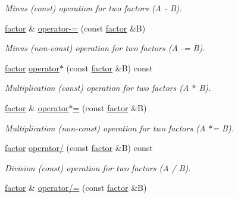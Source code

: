 \begin{DoxyCompactItemize}
\begin{DoxyCompactList}\small\item\em Minus (const) operation for two factors (A -\/ B). \end{DoxyCompactList}\item 
\hyperlink{classmerlin_1_1factor}{factor} \& \hyperlink{classmerlin_1_1factor_a10de91f232933d6631760cf49e2a166b}{operator-\/=} (const \hyperlink{classmerlin_1_1factor}{factor} \&B)\hypertarget{classmerlin_1_1factor_a10de91f232933d6631760cf49e2a166b}{}\label{classmerlin_1_1factor_a10de91f232933d6631760cf49e2a166b}

\begin{DoxyCompactList}\small\item\em Minus (non-\/const) operation for two factors (A -\/= B). \end{DoxyCompactList}\item 
\hyperlink{classmerlin_1_1factor}{factor} \hyperlink{classmerlin_1_1factor_aeea27e3b1a15d46577da00027302e635}{operator$\ast$} (const \hyperlink{classmerlin_1_1factor}{factor} \&B) const \hypertarget{classmerlin_1_1factor_aeea27e3b1a15d46577da00027302e635}{}\label{classmerlin_1_1factor_aeea27e3b1a15d46577da00027302e635}

\begin{DoxyCompactList}\small\item\em Multiplication (const) operation for two factors (A $\ast$ B). \end{DoxyCompactList}\item 
\hyperlink{classmerlin_1_1factor}{factor} \& \hyperlink{classmerlin_1_1factor_af2a5efa9f529f8909d7114741a0d2a9e}{operator$\ast$=} (const \hyperlink{classmerlin_1_1factor}{factor} \&B)\hypertarget{classmerlin_1_1factor_af2a5efa9f529f8909d7114741a0d2a9e}{}\label{classmerlin_1_1factor_af2a5efa9f529f8909d7114741a0d2a9e}

\begin{DoxyCompactList}\small\item\em Multiplication (non-\/const) operation for two factors (A $\ast$= B). \end{DoxyCompactList}\item 
\hyperlink{classmerlin_1_1factor}{factor} \hyperlink{classmerlin_1_1factor_a2e9e4fc69ae5f7dd8a61e54f8aaabb52}{operator/} (const \hyperlink{classmerlin_1_1factor}{factor} \&B) const \hypertarget{classmerlin_1_1factor_a2e9e4fc69ae5f7dd8a61e54f8aaabb52}{}\label{classmerlin_1_1factor_a2e9e4fc69ae5f7dd8a61e54f8aaabb52}

\begin{DoxyCompactList}\small\item\em Division (const) operation for two factors (A / B). \end{DoxyCompactList}\item 
\hyperlink{classmerlin_1_1factor}{factor} \& \hyperlink{classmerlin_1_1factor_a61b3b5a5f8107f5ac154c3630dc2ef1c}{operator/=} (const \hyperlink{classmerlin_1_1factor}{factor} \&B)\hypertarget{classmerlin_1_1factor_a61b3b5a5f8107f5ac154c3630dc2ef1c}{}\label{classmerlin_1_1factor_a61b3b5a5f8107f5ac154c3630dc2ef1c}


\end{DoxyCompactItemize}
